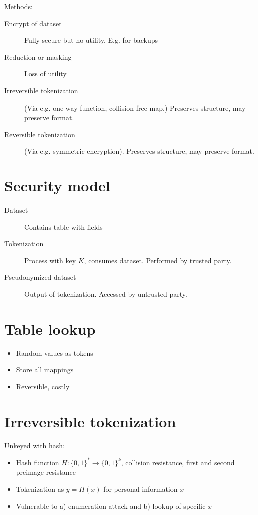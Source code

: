 \documentclass[a4paper]{scrreprt}
\begin{document}
Methods:
\begin{description}
		\item[Encrypt of dataset] Fully secure but no utility. E.g. for backups
		\item[Reduction or masking] Loss of utility
		\item[Irreversible tokenization] (Via e.g. one-way function,
				collision-free map.) Preserves structure, may preserve format.
		\item[Reversible tokenization] (Via e.g. symmetric encryption).
				Preserves structure, may preserve format.
\end{description}

\section{Security model}

\begin{description}
		\item[Dataset] Contains table with fields
		\item[Tokenization] Process with key $K$, consumes dataset. Performed
				by trusted party.
		\item[Pseudonymized dataset] Output of tokenization. Accessed by
				untrusted party.
\end{description}

\section{Table lookup}

\begin{itemize}
		\item Random values as tokens
		\item Store all mappings
		\item Reversible, costly
\end{itemize}

\section{Irreversible tokenization}

Unkeyed with hash:
\begin{itemize}
		\item Hash function $H: \{0, 1\}^* \rightarrow \{0, 1\}^k$, collision
				resistance, first and second preimage resistance
		\item Tokenization as $y = H(x)$ for personal information $x$
		\item Vulnerable to a) enumeration attack and b) lookup of specific $x$
\end{itemize}
\end{document}
